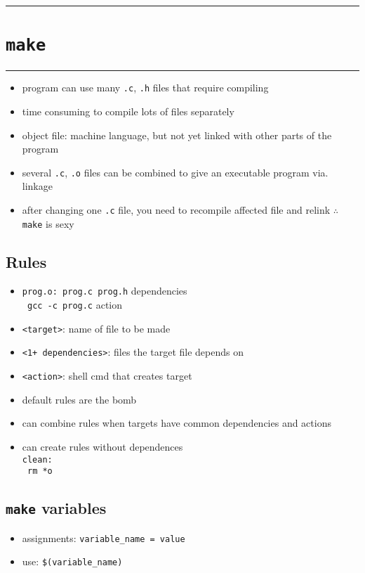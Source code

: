 \documentclass[10pt, multicolumn, a4paper]{article}
\begin{document}
\setcounter{section}{3} %
\hrule
\section{\texttt{make}}
\hrule 

\begin{multicols}{2}
	\begin{itemize}
	\item program can use many \verb|.c|, \verb|.h| files that require compiling
	\item time consuming to compile lots of files separately
	\item object file: machine language, but not yet linked with other parts of the program
	\item several \verb|.c|,  \verb|.o| files can be combined to give an executable program via. linkage
	\item after changing one \verb|.c| file, you need to recompile affected file and relink $\therefore$ \verb|make| is sexy
	\end{itemize}
	\subsection*{Rules}
	\begin{itemize}
	\item \verb|prog.o: prog.c prog.h| \hspace*{5mm} dependencies 
		\\ \texttt{\hspace*{5mm} gcc -c prog.c} \hspace*{13mm} action
	\item \verb|<target>|: name of file to be made
	\item \verb|<1+ dependencies>|: files the target file depends on
	\item \verb|<action>|: shell cmd that creates target
	\item default rules are the bomb
	\item can combine rules when targets have common dependencies and actions
	\item can create rules without dependences
		\\ \verb|clean:| \\ \texttt{\hspace*{5mm} rm *o}
	\end{itemize}
	
	\newpage	
	
	\subsection*{\texttt{make} variables}
	\begin{itemize}
	\item assignments: \verb|variable_name = value|
	\item use: \verb|$(variable_name)|
	\end{itemize}

\end{multicols}
\end{document}
